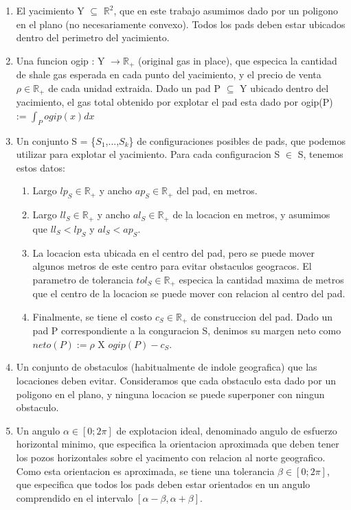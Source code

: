 \begin{enumerate}
\item El yacimiento Y  $\subseteq$ $\mathbb{R}^2$, que en este trabajo asumimos dado por un poligono en el plano (no necesariamente convexo). Todos los pads deben estar ubicados dentro del perimetro del yacimiento.
\item Una funcion ogip : Y $\rightarrow \mathbb{R}_{+}$ (original gas in place), que especica la
cantidad de shale gas esperada en cada punto del yacimiento, y el precio
de venta $\rho  \in \mathbb{R}_{+}$ de cada unidad extraida. Dado un pad P $\subseteq$ Y ubicado
dentro del yacimiento, el gas total obtenido por explotar el pad esta dado
por ogip(P) := $\int_{P}^{} ogip(x) dx$
\item Un conjunto S = \{$S_1$,...,$S_k$\} de configuraciones posibles de pads, que
podemos utilizar para explotar el yacimiento. Para cada configuracion S $\in$ S, tenemos estos datos:
\begin{enumerate}
\item  Largo $lp_S \in \mathbb{R}_{+}$ y ancho $ap_S \in \mathbb{R}_{+}$ del pad, en metros.
\item  Largo $ll_S \in \mathbb{R}_{+}$ y ancho $al_S \in \mathbb{R}_{+}$ de la locacion en metros, y asumimos que $ll_S < lp_S$ y $al_S < ap_S$.
\item  La locacion esta ubicada en el centro del pad, pero se puede mover algunos metros de este centro para evitar obstaculos geogracos. El parametro de tolerancia $tol_S \in \mathbb{R}_{+}$ especica la cantidad maxima de metros que el centro de la locacion se puede mover con relacion
al centro del pad.
\item  Finalmente, se tiene el costo $c_S \in \mathbb{R}_{+}$ de construccion del pad.
Dado un pad P correspondiente a la conguracion S, denimos su margen neto como $neto(P) := \rho$ X $ogip(P) - c_S$.
\end{enumerate}
\item  Un conjunto de obstaculos (habitualmente de indole geografica) que las locaciones deben evitar. Consideramos que cada obstaculo esta dado por un poligono en el plano, y ninguna locacion se puede superponer con ningun obstaculo.
\item Un angulo $\alpha \in [0; 2\pi]$ de explotacion ideal, denominado angulo de esfuerzo horizontal minimo, que especifica la orientacion aproximada que deben tener los pozos horizontales sobre el yacimento con relacion al norte geografico. Como esta orientacion es aproximada, se tiene una tolerancia $\beta \in [0; 2\pi]$, que especifica que todos los pads deben estar orientados en un angulo comprendido en el intervalo $[\alpha - \beta, \alpha + \beta]$.
\end{enumerate}



